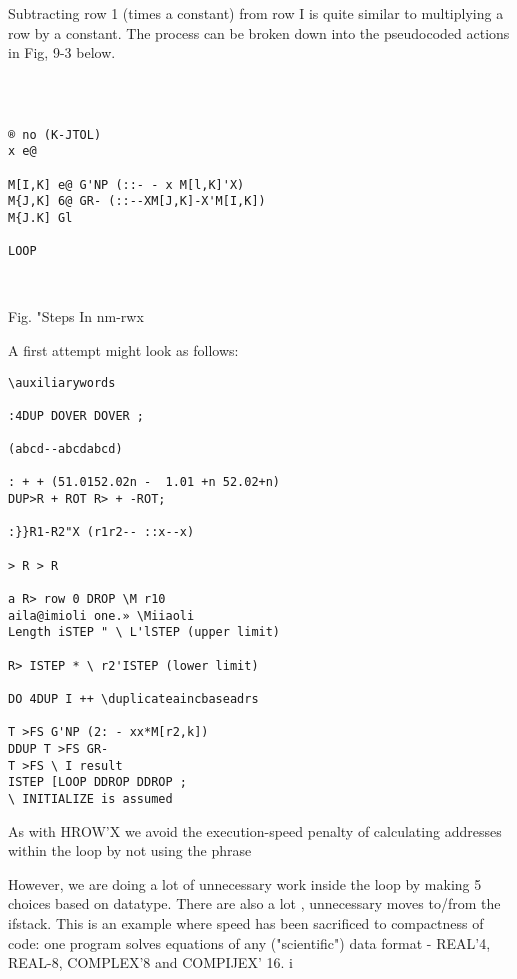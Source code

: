 {{{{{{{{{%

Subtracting row 1 (times a constant) from row I is quite similar to
multiplying a row by a constant. The process can be broken down
into the pseudocoded actions in Fig, 9-3 below.

 
\begin{verbatim}

 

® no (K-JTOL)
x e@

M[I,K] e@ G'NP (::- - x M[l,K]'X)
M{J,K] 6@ GR- (::--XM[J,K]-X'M[I,K])
M{J.K] Gl

LOOP

 

\end{verbatim} 

Fig. "Steps In nm-rwx

A first attempt might look as follows:

\begin{verbatim}
\auxiliarywords

:4DUP DOVER DOVER ;

(abcd--abcdabcd)

: + + (51.0152.02n -  1.01 +n 52.02+n)
DUP>R + ROT R> + -ROT;

:}}R1-R2"X (r1r2-- ::x--x)

> R > R

a R> row 0 DROP \M r10
aila@imioli one.» \Miiaoli
Length iSTEP " \ L'lSTEP (upper limit)

R> ISTEP * \ r2'ISTEP (lower limit)

DO 4DUP I ++ \duplicateaincbaseadrs

T >FS G'NP (2: - xx*M[r2,k])
DDUP T >FS GR-
T >FS \ I result
ISTEP [LOOP DDROP DDROP ;
\ INITIALIZE is assumed

\end{verbatim} 
As with HROW'X we avoid the execution-speed penalty of
calculating addresses within the loop by not using the phrase




     
  
 
 
 

However, we are doing a lot of unnecessary work inside the loop
by making 5 choices based on datatype. There are also a lot ,
unnecessary moves to/from the ifstack. This is an example where
speed has been sacrificed to compactness of code: one program
solves equations of any ("scientific") data format - REAL'4,
REAL-8, COMPLEX'8 and COMPIJEX' 16. i

}}}}}}}}}
